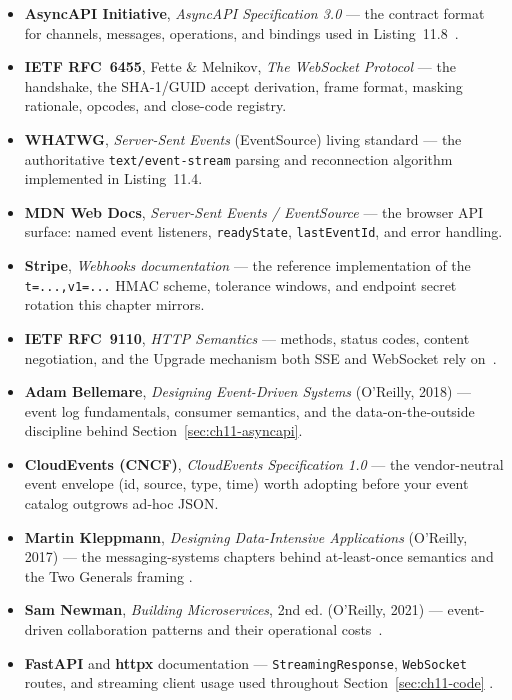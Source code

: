 \begin{itemize}
  \item \textbf{AsyncAPI Initiative}, \emph{AsyncAPI Specification 3.0} ---
        the contract format for channels, messages, operations, and bindings
        used in Listing~11.8~\cite{asyncapi}.
  \item \textbf{IETF RFC~6455}, Fette \& Melnikov, \emph{The WebSocket
        Protocol} --- the handshake, the SHA-1/GUID accept derivation, frame
        format, masking rationale, opcodes, and close-code registry.
  \item \textbf{WHATWG}, \emph{Server-Sent Events} (EventSource) living
        standard --- the authoritative \texttt{text/event-stream} parsing
        and reconnection algorithm implemented in Listing~11.4.
  \item \textbf{MDN Web Docs}, \emph{Server-Sent Events / EventSource} ---
        the browser API surface: named event listeners, \texttt{readyState},
        \texttt{lastEventId}, and error handling.
  \item \textbf{Stripe}, \emph{Webhooks documentation} --- the reference
        implementation of the \texttt{t=...,v1=...} HMAC scheme, tolerance
        windows, and endpoint secret rotation this chapter mirrors.
  \item \textbf{IETF RFC~9110}, \emph{HTTP Semantics} --- methods, status
        codes, content negotiation, and the Upgrade mechanism both SSE and
        WebSocket rely on~\cite{rfc9110}.
  \item \textbf{Adam Bellemare}, \emph{Designing Event-Driven Systems}
        (O'Reilly, 2018) --- event log fundamentals, consumer semantics, and
        the data-on-the-outside discipline behind
        Section~\ref{sec:ch11-asyncapi}.
  \item \textbf{CloudEvents (CNCF)}, \emph{CloudEvents Specification 1.0} ---
        the vendor-neutral event envelope (id, source, type, time) worth
        adopting before your event catalog outgrows ad-hoc JSON.
  \item \textbf{Martin Kleppmann}, \emph{Designing Data-Intensive
        Applications} (O'Reilly, 2017) --- the messaging-systems chapters
        behind at-least-once semantics and the Two Generals framing
        \cite{kleppmann2017ddia}.
  \item \textbf{Sam Newman}, \emph{Building Microservices}, 2nd ed.
        (O'Reilly, 2021) --- event-driven collaboration patterns and their
        operational costs~\cite{newman2021microservices}.
  \item \textbf{FastAPI} and \textbf{httpx} documentation ---
        \texttt{StreamingResponse}, \texttt{WebSocket} routes, and streaming
        client usage used throughout Section~\ref{sec:ch11-code}
        \cite{fastapidocs,httpxdocs}.
\end{itemize}

